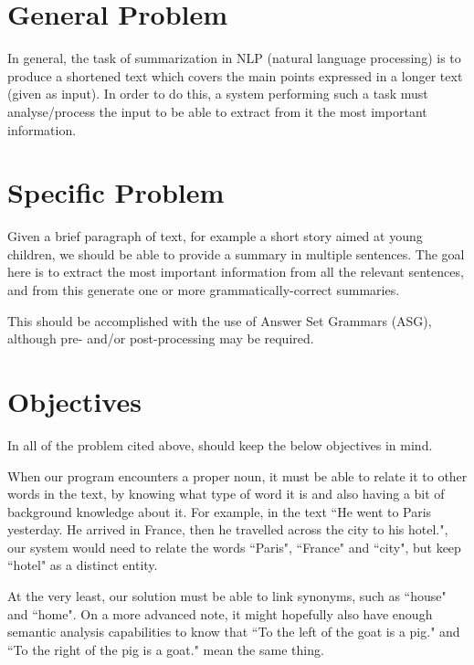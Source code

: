 \label{chapter:introduction}

\section{General Problem}

In general, the task of summarization in NLP (natural language processing) is to produce a shortened text which covers the main points expressed in a longer text (given as input). In order to do this, a system performing such a task must analyse/process the input to be able to extract from it the most important information.

\section{Specific Problem}

Given a brief paragraph of text, for example a short story aimed at young children, we should be able to provide a summary in multiple sentences. The goal here is to extract the most important information from all the relevant sentences, and from this generate one or more grammatically-correct summaries.

This should be accomplished with the use of Answer Set Grammars (ASG), although pre- and/or post-processing may be required.

\section{Objectives}

In all of the problem cited above, should keep the below objectives in mind.

\begin{objective}
When our program encounters a proper noun, it must be able to relate it to other words in the text, by knowing what type of word it is and also having a bit of background knowledge about it. For example, in the text ``He went to Paris yesterday. He arrived in France, then he travelled across the city to his hotel.", our system would need to relate the words ``Paris", ``France" and ``city", but keep ``hotel" as a distinct entity.
\end{objective}

\begin{objective}[Periphrasis]
At the very least, our solution must be able to link synonyms, such as ``house" and ``home". On a more advanced note, it might hopefully also have enough semantic analysis capabilities to know that ``To the left of the goat is a pig." and ``To the right of the pig is a goat." mean the same thing.
\end{objective}


